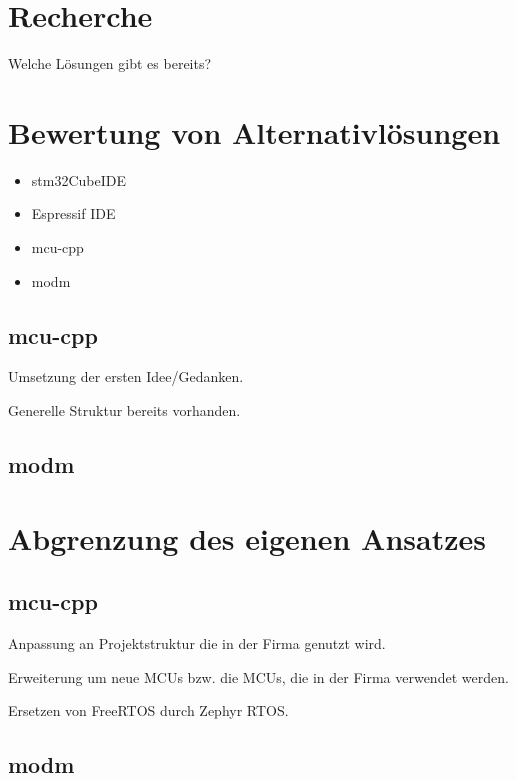 \section{Recherche}
Welche Lösungen gibt es bereits?


\section{Bewertung von Alternativlösungen}
\begin{itemize}
	\item stm32CubeIDE
	\item Espressif IDE
	\item mcu-cpp
	\item modm
\end{itemize}

\subsection{mcu-cpp}
Umsetzung der ersten Idee/Gedanken.

Generelle Struktur bereits vorhanden.

\subsection{modm}


\section{Abgrenzung des eigenen Ansatzes}
\subsection{mcu-cpp}
Anpassung an Projektstruktur die in der Firma genutzt wird.

Erweiterung um neue MCUs bzw. die MCUs, die in der Firma verwendet werden.

Ersetzen von FreeRTOS durch Zephyr RTOS.

\subsection{modm}


